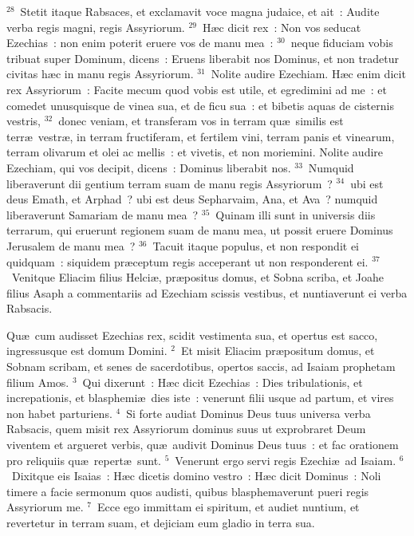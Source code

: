 ${}^{28}$~Stetit itaque Rabsaces, et exclamavit voce magna judaice, et ait~: Audite verba regis magni, regis Assyriorum.
${}^{29}$~H\ae c dicit rex~: Non vos seducat Ezechias~: non enim poterit eruere vos de manu mea~:
${}^{30}$~neque fiduciam vobis tribuat super Dominum, dicens~: Eruens liberabit nos Dominus, et non tradetur civitas h\ae c in manu regis Assyriorum.
${}^{31}$~Nolite audire Ezechiam. H\ae c enim dicit rex Assyriorum~: Facite mecum quod vobis est utile, et egredimini ad me~: et comedet unusquisque de vinea sua, et de ficu sua~: et bibetis aquas de cisternis vestris,
${}^{32}$~donec veniam, et transferam vos in terram qu\ae\ similis est terr\ae\ vestr\ae , in terram fructiferam, et fertilem vini, terram panis et vinearum, terram olivarum et olei ac mellis~: et vivetis, et non moriemini. Nolite audire Ezechiam, qui vos decipit, dicens~: Dominus liberabit nos.
${}^{33}$~Numquid liberaverunt dii gentium terram suam de manu regis Assyriorum~?
${}^{34}$~ubi est deus Emath, et Arphad~? ubi est deus Sepharvaim, Ana, et Ava~? numquid liberaverunt Samariam de manu mea~?
${}^{35}$~Quinam illi sunt in universis diis terrarum, qui eruerunt regionem suam de manu mea, ut possit eruere Dominus Jerusalem de manu mea~?
${}^{36}$~Tacuit itaque populus, et non respondit ei quidquam~: siquidem pr\ae ceptum regis acceperant ut non responderent ei.
${}^{37}$~Venitque Eliacim filius Helci\ae , pr\ae positus domus, et Sobna scriba, et Joahe filius Asaph a commentariis ad Ezechiam scissis vestibus, et nuntiaverunt ei verba Rabsacis.

\bchapter
\lettrine[lines=3,image=true,loversize=0.05,lraise=-0.03]{Q}{}u\ae\ cum audisset Ezechias rex, scidit vestimenta sua, et opertus est sacco, ingressusque est domum Domini.
${}^{2}$~Et misit Eliacim pr\ae positum domus, et Sobnam scribam, et senes de sacerdotibus, opertos saccis, ad Isaiam prophetam filium Amos.
${}^{3}$~Qui dixerunt~: H\ae c dicit Ezechias~: Dies tribulationis, et increpationis, et blasphemi\ae\ dies iste~: venerunt filii usque ad partum, et vires non habet parturiens.
${}^{4}$~Si forte audiat Dominus Deus tuus universa verba Rabsacis, quem misit rex Assyriorum dominus suus ut exprobraret Deum viventem et argueret verbis, qu\ae\ audivit Dominus Deus tuus~: et fac orationem pro reliquiis qu\ae\ repert\ae\ sunt.
${}^{5}$~Venerunt ergo servi regis Ezechi\ae\ ad Isaiam.
${}^{6}$~Dixitque eis Isaias~: H\ae c dicetis domino vestro~: H\ae c dicit Dominus~: Noli timere a facie sermonum quos audisti, quibus blasphemaverunt pueri regis Assyriorum me.
${}^{7}$~Ecce ego immittam ei spiritum, et audiet nuntium, et revertetur in terram suam, et dejiciam eum gladio in terra sua.


